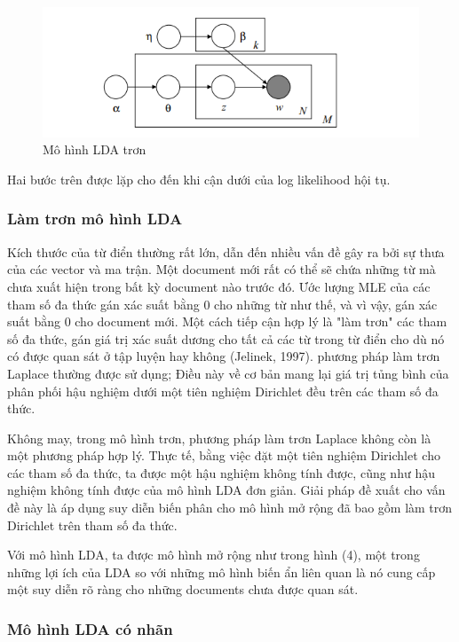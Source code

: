 \documentclass[12pt,a4paper]{article}
\begin{document}
\begin{figure}[h]
    \centering
    \includegraphics[width=.8\textwidth]{smoothlda}
    \caption{Mô hình LDA trơn}
    \label{fig:smoothlda}
\end{figure}

\noindent
Hai bước trên được lặp cho đến khi cận dưới của log likelihood hội tụ.

\subsubsection{Làm trơn mô hình LDA}

Kích thước của từ điển thường rất lớn, dẫn đến nhiều vấn đề gây ra bởi sự thưa của các vector và ma trận. Một document mới rất có thể sẽ chứa những từ mà chưa xuất hiện trong bất kỳ document nào trước đó. Ước lượng MLE của các tham số đa thức gán xác suất bằng 0 cho những từ như thế, và vì vậy, gán xác suất bằng 0 cho document mới. Một cách tiếp cận hợp lý là "làm trơn" các tham số đa thức, gán giá trị xác suất dương cho tất cả các từ trong từ điển cho dù nó có được quan sát ở tập luyện hay không (Jelinek, 1997). phương pháp làm trơn Laplace thường được sử dụng; Điều này về cơ bản mang lại giá trị tủng bình của phân phối hậu nghiệm dưới một tiên nghiệm Dirichlet đều trên các tham số đa thức.


Không may, trong mô hình trơn, phương pháp làm trơn Laplace không còn là một phương pháp hợp lý. Thực tế, bằng việc đặt một tiên nghiệm Dirichlet cho các tham số đa thức, ta được một hậu nghiệm không tính được, cũng như hậu nghiệm không tính được của mô hình LDA đơn giản. Giải pháp đề xuất cho vấn đề này là áp dụng suy diễn biến phân cho mô hình mở rộng đã bao gồm làm trơn Dirichlet trên tham số đa thức.


Với mô hình LDA, ta được mô hình mở rộng như trong hình (4), một trong những lợi ích của LDA so với những mô hình biến ẩn liên quan là nó cung cấp một suy diễn rõ ràng cho những documents chưa được quan sát.


\subsubsection{Mô hình LDA có nhãn}
\end{document}
